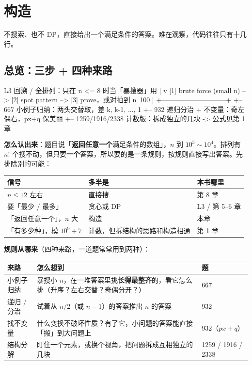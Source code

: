 \section{构造}

不搜索、也不 DP，直接给出一个满足条件的答案。难在观察，代码往往只有十几行。

\subsection{总览：三步 + 四种来路}

\begin{overview}
L3 回溯 / 全排列：只在 n <= 8 时当「暴搜器」用
  |
  v
[1] brute force (small n) --> [2] spot pattern --> [3] prove，或对拍到 n~100
                                    |
      +-----------------------------+
      +-- 667             小例子归纳：两头交替取，差 k, k-1, ..., 1
      +-- 932             递归分治 + 不变量：奇左偶右，px+q 保美丽
      +-- 1259/1916/2338  计数版：拆成独立的几块 -> 公式见第 1 章
\end{overview}

\textbf{怎么认出来}：题目说「\textbf{返回任意一个}满足条件的数组」，$n$ 到 $10^3 \sim 10^4$。排列有 $n!$ 个搜不动，但只要\textbf{一个}答案，所以要的是一条规则，按规则直接写出答案。先排除别的可能：

\begin{tabularx}{\linewidth}{@{}l l X@{}}
\toprule
\textbf{信号} & \textbf{多半是} & \textbf{本书哪里}\\
\midrule
$n \le 12$ 左右 & 直接搜 & 第 8 章\\
要「最少 / 最多」 & 贪心或 DP & L3 / 第 5--6 章\\
「返回任意一个」，$n$ 大 & 构造 & 本章\\
「有多少种」，模 $10^9+7$ & 计数，但拆结构的思路和构造相通 & 第 1 章\\
\bottomrule
\end{tabularx}

\textbf{规则从哪来}（四种来路，一道题常常用到两种）：

\begin{tabularx}{\linewidth}{@{}l X l@{}}
\toprule
\textbf{来路} & \textbf{怎么想到} & \textbf{题}\\
\midrule
小例子归纳 & 暴搜小 $n$，在一堆答案里挑\textbf{长得最整齐}的，看它怎么排（升序？左右交替？奇偶分开？） & 667\\
递归 / 分治 & 试着从 $n/2$（或 $n-1$）的答案推出 $n$ 的答案 & 932\\
找不变量 & 什么变换不破坏性质？有了它，小问题的答案能直接「搬」到大问题上 & 932（$px+q$）\\
结构分解 & 盯住一个元素，或换个视角，把问题拆成互相独立的几块 & 1259 / 1916 / 2338\\
\bottomrule
\end{tabularx}


